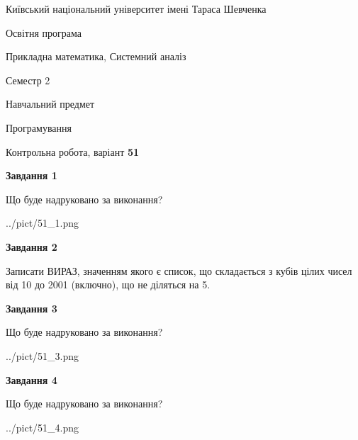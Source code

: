 \documentclass[12pt, ukrainian]{article}
\begin{document}
{{\begin {small}\par
{ \center  Київський національний університет імені Тараса Шевченка \par}
{\parbox {5 cm}{Освітня програма \hfill}{\parbox {8 cm}{Прикладна математика, Системний аналіз \hfill}}\parbox {5 cm}{\hfill Семестр 2}}\par
{\parbox {5 cm} {Навчальний предмет \hfill}\parbox {7 cm}{Програмування \hfill}\parbox {6cm}{\hfill}\par}\vspace{-7pt} \end{small}}{\center Контрольна робота, варіант  \No \textbf
{ 51 }\par}}
{
\begin {large}
{\begin {center}\textbf{Завдання 1}\end {center}}\par
Що буде надруковано за виконання?\par\par
\begin{center}
	{../pict/51_1.png}
\end{center}
\newpage

{\begin {center}\textbf{Завдання 2}\end {center}}\par

Записати ВИРАЗ, значенням якого є список, що складається з кубів цілих чисел від 10 до 2001 (включно), що не діляться на 5.\par
\newpage

{\begin {center}\textbf{Завдання 3}\end {center}}\par
Що буде надруковано за виконання?\par
\begin{center}
	{../pict/51_3.png}
\end{center}
\newpage

{\begin {center}\textbf{Завдання 4}\end {center}}\par
Що буде надруковано за виконання?\par
\begin{center}
	{../pict/51_4.png}
\end{center}
\newpage


\end{large}}
\end{document}

